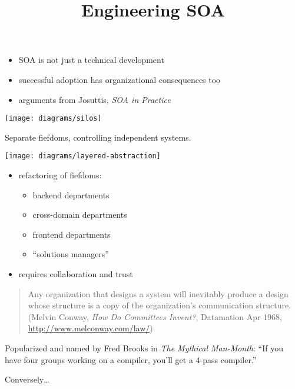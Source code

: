 \documentclass{sepslide-soa-faked} %
\title{Engineering SOA}
\begin{document}
\begin{slide}
  \Title
\end{slide}

\begin{slide}
  \Contents
\end{slide}

\begin{slide}
\begin{itemize}
\item SOA is not just a technical development
\item successful adoption has organizational consequences too
\bigskip
\item arguments from Josuttis, \textit{SOA in Practice}
\end{itemize}
\end{slide}

\begin{slide}
\begin{flushleft}
\texttt{[image: diagrams/silos]}
\end{flushleft}
Separate fiefdoms, controlling independent systems.
\end{slide}

\begin{slide}
\begin{flushleft}
\texttt{[image: diagrams/layered-abstraction]}
\end{flushleft}
\end{slide}

\begin{slide}
\begin{itemize}
\item refactoring of fiefdoms:
  \begin{itemize}
  \item backend departments
  \item cross-domain departments
  \item frontend departments
  \item ``solutions managers'' 
  \end{itemize}
\item requires collaboration and trust
\end{itemize}
\end{slide}

\begin{slide}
\begin{quote} 
{\sffamily Any organization that designs a system will
    inevitably produce a design whose structure is a copy of the
    organization's communication structure.
} \medskip \\
(Melvin Conway, \textit{How Do Committees Invent?}, Datamation Apr 1968,
\url{http://www.melconway.com/law/})
\end{quote}

Popularized and named by Fred Brooks in \textit{The Mythical Man-Month}:
``If you have four groups working on a compiler, you'll get a 4-pass compiler.''

Conversely\ldots
\end{slide}
\end{document}
